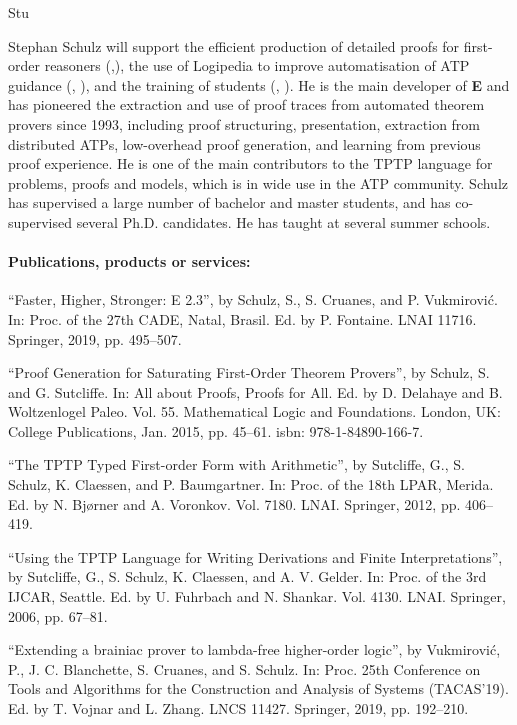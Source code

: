 \begin{sitedescription}{Stu}
\begin{compactitem}
\item Stephan Schulz will support the efficient production of detailed
  proofs for first-order reasoners
  (,), the use of
  Logipedia to improve automatisation of ATP guidance (,
  ), and the training of students
  (, ).  He is
  the main developer of \textbf{E} and has pioneered the extraction
  and use of proof traces from automated theorem provers since 1993,
  including proof structuring, presentation, extraction from
  distributed ATPs, low-overhead proof generation, and learning from
  previous proof experience. He is one of the main contributors to the
  TPTP language for problems, proofs and models, which is in wide use
  in the ATP community. Schulz has supervised a large number of
  bachelor and master students, and has co-supervised several
  Ph.D. candidates. He has taught at several summer schools.
\end{compactitem}

\paragraph*{Publications, products or services:}


\begin{compactitem}
\item “Faster, Higher, Stronger: E 2.3”, by Schulz, S., S. Cruanes, and P. Vukmirović. In: Proc. of the 27th CADE,
Natal, Brasil. Ed. by P. Fontaine. LNAI 11716. Springer, 2019, pp. 495–507.
\item “Proof Generation for Saturating First-Order Theorem Provers”, by Schulz, S. and G. Sutcliffe. In: All about
Proofs, Proofs for All. Ed. by D. Delahaye and B. Woltzenlogel Paleo. Vol. 55. Mathematical Logic
and Foundations. London, UK: College Publications, Jan. 2015, pp. 45–61. isbn: 978-1-84890-166-7.
\item “The TPTP Typed First-order Form with
Arithmetic”, by Sutcliffe, G., S. Schulz, K. Claessen, and P. Baumgartner. In: Proc. of the 18th LPAR, Merida. Ed. by N. Bjørner and A. Voronkov. Vol. 7180.
LNAI. Springer, 2012, pp. 406–419.
\item “Using the TPTP Language for Writing Derivations
and Finite Interpretations”, by Sutcliffe, G., S. Schulz, K. Claessen, and A. V. Gelder. In: Proc. of the 3rd IJCAR, Seattle. Ed. by U. Fuhrbach and N. Shankar.
Vol. 4130. LNAI. Springer, 2006, pp. 67–81.
\item “Extending a brainiac prover to lambda-free
higher-order logic”, by Vukmirović, P., J. C. Blanchette, S. Cruanes, and S. Schulz. In: Proc. 25th Conference on Tools and Algorithms for the Construction and
Analysis of Systems (TACAS’19). Ed. by T. Vojnar and L. Zhang. LNCS 11427. Springer, 2019,
pp. 192–210.
\end{compactitem}


\end{sitedescription}
